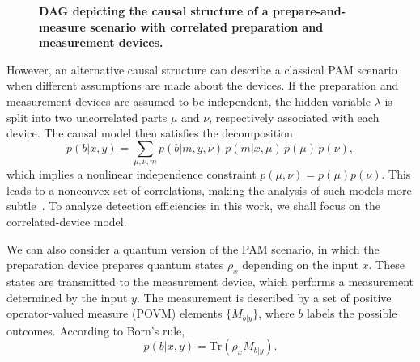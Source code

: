 \documentclass[aps,pra,reprint, superscriptaddress,showkeys]{revtex4-2}
\theoremstyle{plain}
\begin{document}
\begin{figure}[h!]
\centering
{}
\caption{\justifying \textbf{DAG depicting the causal structure of a prepare-and-measure scenario with correlated preparation and measurement devices.}}
\label{fig:PAM}
\end{figure}

However, an alternative causal structure can describe a classical PAM scenario when different assumptions are made about the devices. If the preparation and measurement devices are assumed to be independent, the hidden variable \(\lambda\) is split into two uncorrelated parts \(\mu\) and \(\nu\), respectively associated with each device. The causal model then satisfies the decomposition
\begin{equation}
    p(b|x,y) = \sum_{\mu, \nu, m} p(b|m, y, \nu)\, p(m|x, \mu)\, p(\mu)\, p(\nu),
\end{equation}
which implies a nonlinear independence constraint \(p(\mu, \nu) = p(\mu) p(\nu)\). This leads to a nonconvex set of correlations, making the analysis of such models more subtle~\cite{bowles2014, davide2020}. To analyze detection efficiencies in this work, we shall focus on the correlated-device model.

We can also consider a quantum version of the PAM scenario, in which the preparation device prepares quantum states \(\rho_x\) depending on the input \(x\). These states are transmitted to the measurement device, which performs a measurement determined by the input \(y\). The measurement is described by a set of positive operator-valued measure (POVM) elements \(\{M_{b|y}\}\), where \(b\) labels the possible outcomes. According to Born's rule,
\begin{equation}
    p(b|x,y) = \mathrm{Tr}\left( \rho_x M_{b|y} \right).
\end{equation}
\end{document}

